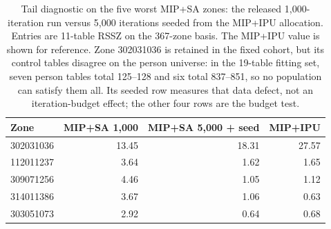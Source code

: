 \begin{table}[h!]
\centering
\caption{Tail diagnostic on the five worst MIP+SA zones: the released
1{,}000-iteration run versus 5{,}000 iterations seeded from the MIP+IPU
allocation. Entries are 11-table RSSZ on the 367-zone basis. The MIP+IPU
value is shown for reference. Zone 302031036 is retained in the fixed cohort,
but its control tables disagree on the person universe: in the 19-table
fitting set, seven person tables total 125--128 and six total 837--851, so no
population can satisfy them all. Its
seeded row measures that data defect, not an iteration-budget effect; the other
four rows are the budget test.}
\label{tab:cp_sa_tail}
\footnotesize
\begin{tabular}{@{}lrrr@{}}
\toprule
Zone & MIP+SA 1{,}000 & MIP+SA 5{,}000 + seed & MIP+IPU \\
\midrule
302031036 & 13.45 & 18.31 & 27.57 \\
112011237 & 3.64 & 1.62 & 1.65 \\
309071256 & 4.46 & 1.05 & 1.12 \\
314011386 & 3.67 & 1.06 & 0.63 \\
303051073 & 2.92 & 0.64 & 0.68 \\
\bottomrule
\end{tabular}
\end{table}

